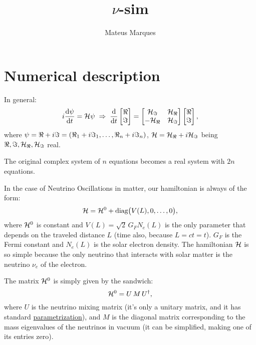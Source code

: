 \documentclass[a4paper,fleqn,12pt]{article}
\title{\huge{$\nu$-sim}}
\author{Mateus Marques}
\begin{document}
\maketitle

\section{Numerical description}

In general:
$$
i \dv{\psi}{t} = \H \psi
\implies
\dv{}{t}
\begin{bmatrix}
\real \\ \imaginary
\end{bmatrix}
=
\begin{bmatrix}
\H_\imaginary & \H_\real \\
-\H_\real & \H_\imaginary
\end{bmatrix}
\begin{bmatrix}
\real \\ \imaginary
\end{bmatrix},
$$
where $\psi = \real + i \imaginary = (\real_1 + i \imaginary_1, \ldots, \real_n + i \imaginary_n)$, $\H = \H_\real + i \H_\imaginary$ being $\real, \imaginary, \H_\real, \H_\imaginary$ real.

The original complex system of $n$ equations becomes a real system with $2n$ equations.

In the case of Neutrino Oscillations in matter, our hamiltonian is always of the form:
$$
\mathcal{H} = \mathcal{H}^0 + \text{diag}\big(V(L), 0, \ldots, 0\big),
$$
where $\mathcal{H}^0$ is constant and $V(L) = \sqrt{2} \, G_F N_e(L)$ is the only parameter that depends on the traveled distance $L$ (time also, because $L = ct = t$). $G_F$ is the Fermi constant and $N_e(L)$ is the solar electron density. The hamiltonian $\mathcal{H}$ is so simple because the only neutrino that interacts with solar matter is the neutrino $\nu_e$ of the electron.

The matrix $\mathcal{H}^0$ is simply given by the sandwich:
$$
\mathcal{H}^0 = U \, M \, U^\dagger,
$$
where $U$ is the neutrino mixing matrix (it's only a unitary matrix, and it has standard \href{https://en.wikipedia.org/wiki/Pontecorvo%E2%80%93Maki%E2%80%93Nakagawa%E2%80%93Sakata_matrix}{parametrization}),
and $M$ is the diagonal matrix corresponding to the mass eigenvalues of the neutrinos in vacuum (it can be simplified, making one of its entries zero).
\end{document}
